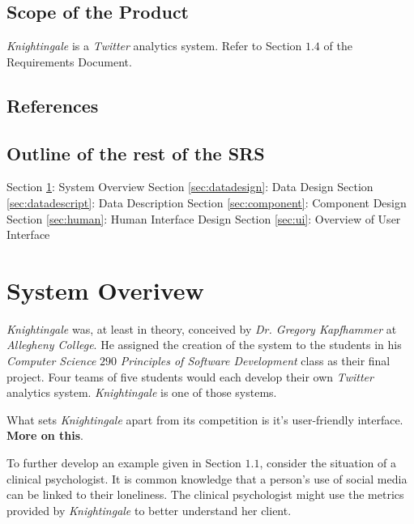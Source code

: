 \documentclass[a4paper, 12pt]{article}
\begin{document}
\subsection{Scope of the Product} \label{sec:scope}
\begin{adjustwidth}{2em}{0pt}
\textit{Knightingale} is a \textit{Twitter} analytics system. Refer to Section $1.4$ of the Requirements Document.
\end{adjustwidth}

\subsection{References} \label{sec:ref}
\begin{adjustwidth}{2em}{0pt}

\end{adjustwidth}

\subsection{Outline of the rest of the SRS} \label{sec:outline}
\begin{adjustwidth}{2em}{0pt}
Section \ref{sec:overview}: System Overview \newline
Section \ref{sec:datadesign}: Data Design \newline
Section \ref{sec:datadescript}: Data Description \newline
Section \ref{sec:component}: Component Design \newline
Section \ref{sec:human}: Human Interface Design \newline
Section \ref{sec:ui}: Overview of User Interface \newline
\end{adjustwidth}

\section{System Overivew} \label{sec:overview}
\begin{adjustwidth}{1em}{0pt}
\textit{Knightingale} was, at least in theory, conceived by \textit{Dr. Gregory Kapfhammer} at \textit{Allegheny College}. He assigned the creation of the system to the students in his \textit{Computer Science} $290$ \textit{Principles of Software Development} class as their final project. Four teams of five students would each develop their own \textit{Twitter} analytics system. \textit{Knightingale} is one of those systems. \newline

\noindent What sets \textit{Knightingale} apart from its competition is it's user-friendly interface. \textbf{More on this}. \newline

\noindent To further develop an example given in Section $1.1$, consider the situation of a clinical psychologist. It is common knowledge that a person's use of social media can be linked to their loneliness. The clinical psychologist might use the metrics provided by \textit{Knightingale} to better understand her client. 
\end{adjustwidth}
 
\end{document}

